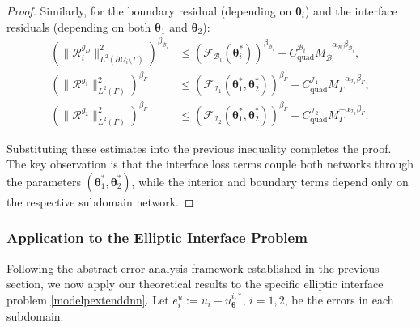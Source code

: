 \documentclass{article}
\newtheorem{proof}{Proof}[section]
\begin{document}
\begin{proof}
Similarly, for the boundary residual (depending on $\boldsymbol{\theta}_i$) and the interface residuals (depending on both $\boldsymbol{\theta}_1$ and $\boldsymbol{\theta}_2$):
\begin{equation}
\begin{aligned}
\left(\|\mathcal{R}^{g_D}_i\|^2_{L^2(\partial\Omega_i \setminus \Gamma)}\right)^{\beta_{\mathcal{B}_i}} &\leq (\mathcal{F}_{\mathcal{B}_i}(\boldsymbol{\theta}_i^*))^{\beta_{\mathcal{B}_i}} + C_{\text{quad}}^{\mathcal{B}_i}M_{\mathcal{B}_i}^{-\alpha_{\mathcal{B}_i}\beta_{\mathcal{B}_i}},  \\
\left(\|\mathcal{R}^{g_1}\|^2_{L^2(\Gamma)}\right)^{\beta_{\Gamma}} &\leq (\mathcal{F}_{\mathcal{I}_1}(\boldsymbol{\theta}_1^*, \boldsymbol{\theta}_2^*))^{\beta_{\Gamma}} + C_{\text{quad}}^{\mathcal{I}_1}M_{\Gamma}^{-\alpha_{\mathcal{I}_1}\beta_{\Gamma}},\\
\left(\|\mathcal{R}^{g_2}\|^2_{L^2(\Gamma)}\right)^{\beta_{\Gamma}} &\leq (\mathcal{F}_{\mathcal{I}_2}(\boldsymbol{\theta}_1^*, \boldsymbol{\theta}_2^*))^{\beta_{\Gamma}} + C_{\text{quad}}^{\mathcal{I}_2}M_{\Gamma}^{-\alpha_{\mathcal{I}_2}\beta_{\Gamma}}.
\end{aligned}
\end{equation}

Substituting these estimates into the previous inequality completes the proof. The key observation is that the interface loss terms couple both networks through the parameters $(\boldsymbol{\theta}_1^*, \boldsymbol{\theta}_2^*)$, while the interior and boundary terms depend only on the respective subdomain network.
\end{proof}

\subsubsection{Application to the Elliptic Interface Problem}

Following the abstract error analysis framework established in the previous section, we now apply our theoretical results to the specific elliptic interface problem \eqref{modelpextenddnn}. Let $e_i^u := u_i - u_{\boldsymbol{\theta}}^{i,*}$, $i = 1, 2$, be the errors in each subdomain. 
\end{document}
